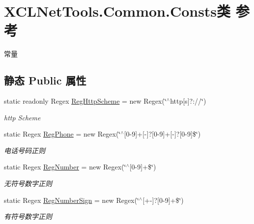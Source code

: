 \hypertarget{class_x_c_l_net_tools_1_1_common_1_1_consts}{}\section{X\+C\+L\+Net\+Tools.\+Common.\+Consts类 参考}
\label{class_x_c_l_net_tools_1_1_common_1_1_consts}


常量  


\subsection*{静态 Public 属性}
\begin{DoxyCompactItemize}
\item 
static readonly Regex \hyperlink{class_x_c_l_net_tools_1_1_common_1_1_consts_a86f2f516b20b37531db1c7bffea20087}{Reg\+Http\+Scheme} = new Regex(\char`\"{}$^\wedge$http\mbox{[}s\mbox{]}?\+://\char`\"{})
\begin{DoxyCompactList}\small\item\em http Scheme \end{DoxyCompactList}\item 
static Regex \hyperlink{class_x_c_l_net_tools_1_1_common_1_1_consts_a88185aad823255cb7bf15a88d8ef55de}{Reg\+Phone} = new Regex(\char`\"{}$^\wedge$\mbox{[}0-\/9\mbox{]}+\mbox{[}-\/\mbox{]}?\mbox{[}0-\/9\mbox{]}+\mbox{[}-\/\mbox{]}?\mbox{[}0-\/9\mbox{]}\$\char`\"{})
\begin{DoxyCompactList}\small\item\em 电话号码正则 \end{DoxyCompactList}\item 
static Regex \hyperlink{class_x_c_l_net_tools_1_1_common_1_1_consts_a77b7430f7b6be306f3168d8f954803ec}{Reg\+Number} = new Regex(\char`\"{}$^\wedge$\mbox{[}0-\/9\mbox{]}+\$\char`\"{})
\begin{DoxyCompactList}\small\item\em 无符号数字正则 \end{DoxyCompactList}\item 
static Regex \hyperlink{class_x_c_l_net_tools_1_1_common_1_1_consts_aaa6eaa871d664473d2e6d189c825f177}{Reg\+Number\+Sign} = new Regex(\char`\"{}$^\wedge$\mbox{[}+-\/\mbox{]}?\mbox{[}0-\/9\mbox{]}+\$\char`\"{})
\begin{DoxyCompactList}\small\item\em 有符号数字正则 \end{DoxyCompactList}\item 

\end{DoxyCompactItemize}
